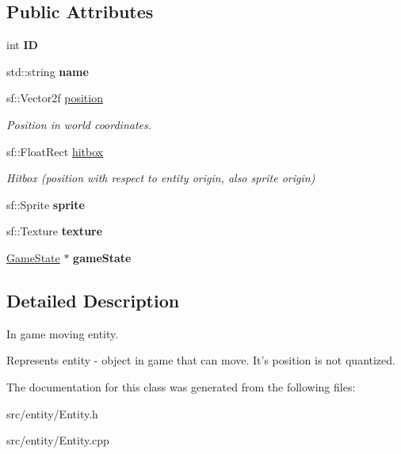 \subsection*{Public Attributes}
\begin{DoxyCompactItemize}
\item 
\hypertarget{classEntity_a5c92b546dedae9ce473274d82c8585f6}{int {\bfseries I\-D}}\label{classEntity_a5c92b546dedae9ce473274d82c8585f6}

\item 
\hypertarget{classEntity_a931b21fbdebb1a5963b4bcab5df128f5}{std\-::string {\bfseries name}}\label{classEntity_a931b21fbdebb1a5963b4bcab5df128f5}

\item 
\hypertarget{classEntity_afc349ec89c2bffef70bf6a1d95603154}{sf\-::\-Vector2f \hyperlink{classEntity_afc349ec89c2bffef70bf6a1d95603154}{position}}\label{classEntity_afc349ec89c2bffef70bf6a1d95603154}

\begin{DoxyCompactList}\small\item\em Position in world coordinates. \end{DoxyCompactList}\item 
\hypertarget{classEntity_a3bed8137e87ee1923135c5b24207da60}{sf\-::\-Float\-Rect \hyperlink{classEntity_a3bed8137e87ee1923135c5b24207da60}{hitbox}}\label{classEntity_a3bed8137e87ee1923135c5b24207da60}

\begin{DoxyCompactList}\small\item\em Hitbox (position with respect to entity origin, also sprite origin) \end{DoxyCompactList}\item 
\hypertarget{classEntity_a48ef4ab143b8d0211877c9f6be42e824}{sf\-::\-Sprite {\bfseries sprite}}\label{classEntity_a48ef4ab143b8d0211877c9f6be42e824}

\item 
\hypertarget{classEntity_ad64dd6d282432a68475f30f7c7bbdc88}{sf\-::\-Texture {\bfseries texture}}\label{classEntity_ad64dd6d282432a68475f30f7c7bbdc88}

\item 
\hypertarget{classEntity_a841bc61c53bf764fe598f42b19370ab2}{\hyperlink{classGameState}{Game\-State} $\ast$ {\bfseries game\-State}}\label{classEntity_a841bc61c53bf764fe598f42b19370ab2}

\end{DoxyCompactItemize}


\subsection{Detailed Description}
In game moving entity. 

Represents entity -\/ object in game that can move. It's position is not quantized. 

The documentation for this class was generated from the following files\-:\begin{DoxyCompactItemize}
\item 
src/entity/Entity.\-h\item 
src/entity/Entity.\-cpp\end{DoxyCompactItemize}
